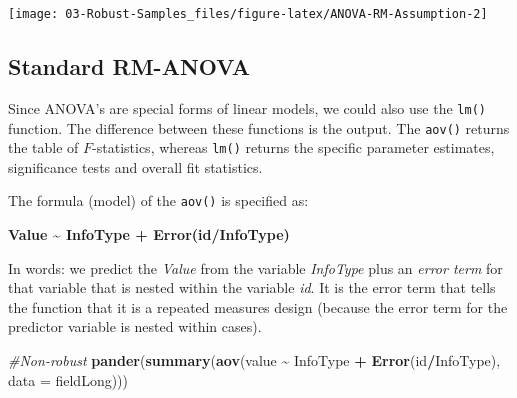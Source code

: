 \documentclass[
]{article}
\newenvironment{Shaded}{\begin{snugshade}}{\end{snugshade}}
\newcommand{\AttributeTok}[1]{\textcolor[rgb]{0.13,0.29,0.53}{#1}}
\newcommand{\CommentTok}[1]{\textcolor[rgb]{0.56,0.35,0.01}{\textit{#1}}}
\newcommand{\FunctionTok}[1]{\textcolor[rgb]{0.13,0.29,0.53}{\textbf{#1}}}
\newcommand{\NormalTok}[1]{#1}
\newcommand{\SpecialCharTok}[1]{\textcolor[rgb]{0.81,0.36,0.00}{\textbf{#1}}}
\begin{document}
\begin{center}\texttt{[image: 03-Robust-Samples\_files/figure-latex/ANOVA-RM-Assumption-2]} \end{center}

\subsection*{Standard RM-ANOVA}\label{standard-rm-anova}

Since ANOVA's are special forms of linear models, we could also use the \texttt{lm()} function. The difference between these functions is the output. The \texttt{aov()} returns the table of \(F\)-statistics, whereas \texttt{lm()} returns the specific parameter estimates, significance tests and overall fit statistics.

The formula (model) of the \texttt{aov()} is specified as:

\textbf{Value \textasciitilde{} InfoType + Error(id/InfoType)}

In words: we predict the \emph{Value} from the variable \emph{InfoType} plus an \emph{error term} for that variable that is nested within the variable \emph{id}. It is the error term that tells the function that it is a repeated measures design (because the error term for the predictor variable is nested within cases).

\begin{Shaded}
\begin{Highlighting}[]
  \CommentTok{\#Non{-}robust}
  \FunctionTok{pander}\NormalTok{(}\FunctionTok{summary}\NormalTok{(}\FunctionTok{aov}\NormalTok{(value }\SpecialCharTok{\textasciitilde{}}\NormalTok{ InfoType }\SpecialCharTok{+} \FunctionTok{Error}\NormalTok{(id}\SpecialCharTok{/}\NormalTok{InfoType), }\AttributeTok{data =}\NormalTok{ fieldLong)))}
\end{Highlighting}
\end{Shaded}
\end{document}
